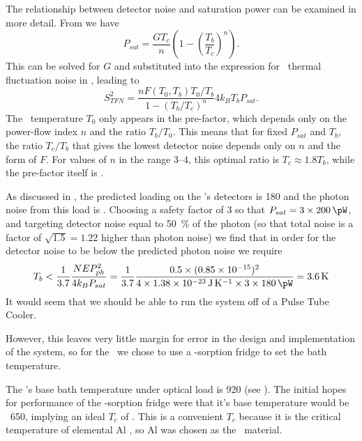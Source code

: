 The relationship between detector noise and saturation power can be examined in more detail.
From  we have
\begin{equation} \label{eqn:ch5-psat}
P_{sat} = \frac{G T_c}{n}\left(1 - \left(\frac{T_b}{T_c}\right)^n\right).
\end{equation}
This can be solved for $G$ and substituted into the expression for \TES\ thermal fluctuation noise in , leading to
\begin{equation} \label{eqn:ch5-tes-noise}
S^2_{TFN} = \frac{n F(T_0, T_b) T_0 / T_b}{1-(T_b/T_c)^n} 4 k_B T_b P_{sat}.
\end{equation}
The \TES\ temperature $T_0$ only appears in the pre-factor, which depends only on the power-flow index $n$ and the ratio $T_b/T_0$.
This means that for fixed $P_{sat}$ and $T_b$, the ratio $T_c/T_b$ that gives the lowest detector noise depends only on $n$ and the form of $F$.
For values of $n$ in the range 3--4, this optimal ratio is $T_c \approx 1.8 T_b$, while the pre-factor itself is .

As discussed in , the predicted loading on the \Imager's detectors is \SI{180}{\pW} and the photon noise from this load is .
Choosing a safety factor of 3 so that $P_{sat} = 3 \times \SI{200}{\pW}$, and targeting detector noise equal to \SI{50}{\percent} of the photon (so that total noise is a factor of $\sqrt{1.5} = 1.22$ higher than photon noise) we find that in order for the detector noise to be below the predicted photon noise we require
\begin{equation}
  T_b < \frac{1}{3.7} \frac{\NEPph^2}{4 k_B P_{sat}} =
        \frac{1}{3.7} \frac{0.5 \times (\num{0.85e-15})^2}{4 \times \SI{1.38e-23}{\J\per\K} \times 3 \times \SI{180}{\pW}} = 
        \SI{3.6}{\K}
\end{equation}
It would seem that we should be able to run the system off of a Pulse Tube Cooler.

However, this leaves very little margin for error in the design and implementation of the system, so for the \Imager\ we chose to use a -sorption fridge to set the bath temperature.

The \Imager's base bath temperature under optical load is \SI{920}{\pW} (see ).
The initial hopes for performance of the -sorption fridge were that it's base temperature would be ~\SI{650}{\mK}, implying an ideal $T_c$ of .
This is a convenient $T_c$ because it is the critical temperature of elemental Al \cite{xxx}, so Al was chosen as the \TES\ material.

